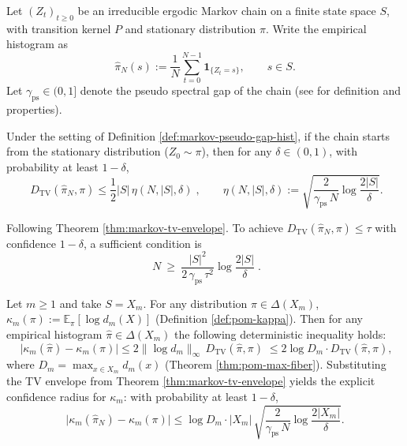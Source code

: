 \begin{definition}\label{def:markov-pseudo-gap-hist}
Let \((Z_t)_{t\ge 0}\) be an irreducible ergodic Markov chain on a finite state space \(S\), with transition kernel \(P\) and stationary distribution \(\pi\).
Write the empirical histogram as
\[
\hat{\pi}_N(s):=\frac{1}{N}\sum_{t=0}^{N-1}\mathbf{1}_{\{Z_t=s\}},\qquad s\in S.
\]
Let \(\gamma_{\mathrm{ps}}\in(0,1]\) denote the pseudo spectral gap of the chain (see \cite{Paulin2015MarkovConcentration} for definition and properties).
\end{definition}

\begin{theorem}\label{thm:markov-tv-envelope}
Under the setting of Definition \ref{def:markov-pseudo-gap-hist}, if the chain starts from the stationary distribution (\(Z_0\sim\pi\)), then for any \(\delta\in(0,1)\), with probability at least \(1-\delta\),
\[
\boxed{\;
D_{\mathrm{TV}}(\hat{\pi}_N,\pi)\le \frac12|S|\,\eta(N,|S|,\delta)\;},
\qquad
\eta(N,|S|,\delta):=\sqrt{\frac{2}{\gamma_{\mathrm{ps}}\,N}\log\frac{2|S|}{\delta}}.
\]
\end{theorem}

\begin{corollary}\label{cor:markov-tv-sample-complexity}
Following Theorem \ref{thm:markov-tv-envelope}. To achieve
\(
D_{\mathrm{TV}}(\hat{\pi}_N,\pi)\le \tau
\)
with confidence \(1-\delta\), a sufficient condition is
\[
\boxed{\;
N\ \ge\ \frac{|S|^{2}}{2\,\gamma_{\mathrm{ps}}\,\tau^{2}}
\log\frac{2|S|}{\delta}\; }.
\]
\end{corollary}

\begin{corollary}\label{cor:kappa-confidence-from-tv}
Let \(m\ge 1\) and take \(S=X_m\). For any distribution \(\pi\in\Delta(X_m)\), \(\kappa_m(\pi):=\mathbb{E}_{\pi}[\log d_m(X)]\) (Definition \ref{def:pom-kappa}).
Then for any empirical histogram \(\hat{\pi}\in\Delta(X_m)\) the following deterministic inequality holds:
\[
\boxed{\;
\bigl|\kappa_m(\hat{\pi})-\kappa_m(\pi)\bigr|
\le 2\|\log d_m\|_{\infty}\,D_{\mathrm{TV}}(\hat{\pi},\pi)\;}
\le 2\log D_m\cdot D_{\mathrm{TV}}(\hat{\pi},\pi),
\]
where \(D_m=\max_{x\in X_m}d_m(x)\) (Theorem \ref{thm:pom-max-fiber}).
Substituting the TV envelope from Theorem \ref{thm:markov-tv-envelope} yields the explicit confidence radius for \(\kappa_m\):
with probability at least \(1-\delta\),
\[
\bigl|\kappa_m(\hat{\pi}_N)-\kappa_m(\pi)\bigr|
\le \log D_m\cdot |X_m|\,
\sqrt{\frac{2}{\gamma_{\mathrm{ps}}\,N}\log\frac{2|X_m|}{\delta}}.
\]
\end{corollary}

